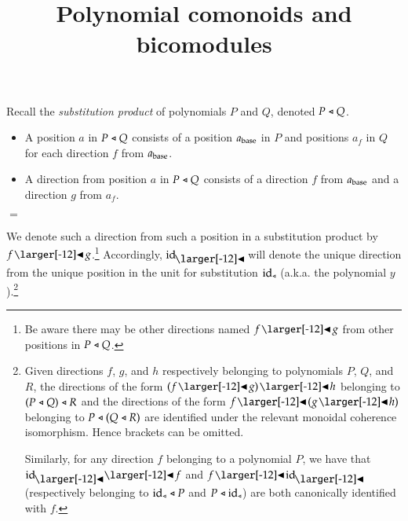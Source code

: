 \documentclass{amsart}
\title{Polynomial comonoids and bicomodules}
\begin{document}
\maketitle

\vspace{1.5em}

\iffalse
  A \emph{polynomial}\footnote{The name refers to a correspondence
    between families of sets and sums of powers, illustrated by the
    example
    ${2y^4 + y^2 + y \leftrightarrow
      \{\{\ast,\ast,\ast,\ast\},\{\ast,\ast,\ast,\ast\},\{\ast,\ast\},
      \{\ast\}\}}$.} is an indexed family of sets.

  The indexes of sets are called \emph{positions}, and the members of
  indexed sets are called \emph{directions}.

  We will visualize a polynomial as a collection of corollas.


  A corolla is a node with arrows pointing out from it; this denotes a
  position and the directions from it.
\fi

Recall the \emph{substitution product} of polynomials $P$ and $Q$, denoted
$P \sub Q$.

\iffalse
  From polynomials $P$ and $Q$, we can form a new polynomial
  of all the possible two-story trees built by stacking $Q$
  corollas atop a $P$ corolla. This is called the \emph{substitution
    product}, denoted $P \sub Q$.
\fi

\begin{itemize}
\item A position $a$ in $P \sub Q$ consists of a position $a_{\mathrm{base}}$ in
  $P$ and positions $a_f$ in $Q$ for each direction $f$ from
  $a_{\mathrm{base}}$.
\item A direction from position $a$ in $P \sub Q$ consists of a
  direction $f$ from $a_{\mathrm{base}}$ and a direction $g$ from $a_f$.
\end{itemize}
\vspace{.5em}
\begin{center}
  
  \qquad
  {\Large$=$}
  \quad
  
\end{center}
\vspace{1em}

We denote such a direction from such a position in a substitution
product by $f \subd g$.\footnote{Be aware there may be other
  directions named $f \subd g$ from other positions in
  $P \sub Q$.} Accordingly, $\idsubd$ will denote the unique direction
from the unique position in the unit for substitution $\mathrm{id}_{\mathrel{\triangleleft}}$
(a.k.a. the polynomial $y$).\footnote{Given directions $f$,
    $g$, and $h$ respectively belonging to polynomials $P$, $Q$, and
    $R$, the directions of the form $(f \subd g)\subd h$ belonging to
    $(P \mathrel{\triangleleft} Q) \mathrel{\triangleleft} R$ and the directions of the form
    $f \subd (g \subd h)$ belonging to $P \mathrel{\triangleleft} (Q \mathrel{\triangleleft} R)$ are
    identified under the relevant monoidal coherence
    isomorphism. Hence brackets can be omitted.

  Similarly, for any direction $f$ belonging to a polynomial $P$, we
  have that $\idsubd \subd f$ and $f \subd \idsubd$ (respectively
  belonging to $\mathrm{id}_{\mathrel{\triangleleft}} \mathrel{\triangleleft} P$ and $P \mathrel{\triangleleft} \mathrm{id}_{\mathrel{\triangleleft}}$) are both
  canonically identified with $f$.}
\end{document}
